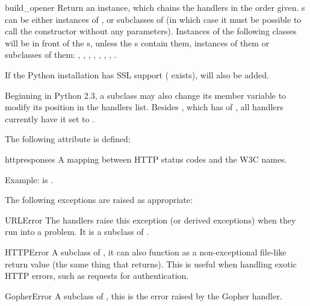 \begin{funcdesc}{build_opener}{}
Return an  instance, which chains the
handlers in the order given. s can be either instances
of , or subclasses of  (in
which case it must be possible to call the constructor without
any parameters).  Instances of the following classes will be in
front of the s, unless the s contain
them, instances of them or subclasses of them:
, , ,
, ,
, , .

If the Python installation has SSL support (
exists),  will also be added.

Beginning in Python 2.3, a  subclass may also
change its  member variable to modify its
position in the handlers list. Besides , which has
 of , all handlers currently have it
set to .
\end{funcdesc}


The following attribute is defined:

\begin{datadesc}{httpresponses}
A mapping between HTTP status codes and the W3C names.

Example:  is .
\end{datadesc}

The following exceptions are raised as appropriate:

\begin{excdesc}{URLError}
The handlers raise this exception (or derived exceptions) when they
run into a problem.  It is a subclass of .
\end{excdesc}

\begin{excdesc}{HTTPError}
A subclass of , it can also function as a 
non-exceptional file-like return value (the same thing that
 returns).  This is useful when handling exotic
HTTP errors, such as requests for authentication.
\end{excdesc}

\begin{excdesc}{GopherError}
A subclass of , this is the error raised by the
Gopher handler.
\end{excdesc}


